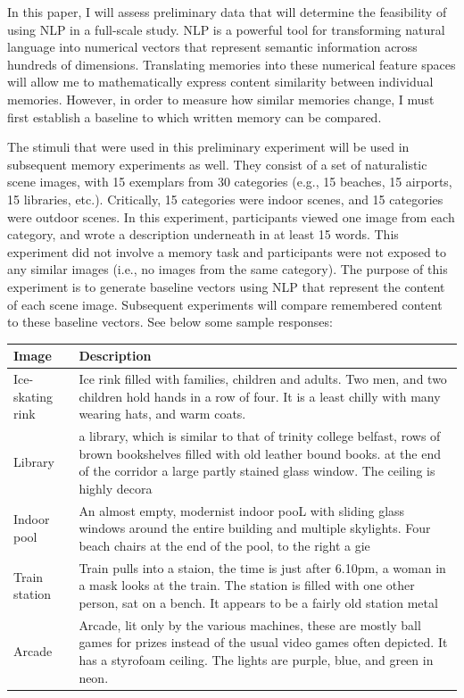 \documentclass[
  english,
  man]{apa6}
\begin{document}
In this paper, I will assess preliminary data that will determine the feasibility of using NLP in a full-scale study. NLP is a powerful tool for transforming natural language into numerical vectors that represent semantic information across hundreds of dimensions. Translating memories into these numerical feature spaces will allow me to mathematically express content similarity between individual memories. However, in order to measure how similar memories change, I must first establish a baseline to which written memory can be compared.

The stimuli that were used in this preliminary experiment will be used in subsequent memory experiments as well. They consist of a set of naturalistic scene images, with 15 exemplars from 30 categories (e.g., 15 beaches, 15 airports, 15 libraries, etc.). Critically, 15 categories were indoor scenes, and 15 categories were outdoor scenes. In this experiment, participants viewed one image from each category, and wrote a description underneath in at least 15 words. This experiment did not involve a memory task and participants were not exposed to any similar images (i.e., no images from the same category). The purpose of this experiment is to generate baseline vectors using NLP that represent the content of each scene image. Subsequent experiments will compare remembered content to these baseline vectors. See below some sample responses:

\begin{tabular}{l|>{\raggedright\arraybackslash}p{25em}}
\hline
Image & Description\\
\hline
Ice-skating rink & Ice rink filled with families, children and adults. Two men, and two children hold hands in a row of four. It is a least chilly with many wearing hats, and warm coats.\\
\hline
Library & a library, which is similar to that of trinity college belfast, rows of brown bookshelves filled with old leather bound books. at the end of the corridor a large partly stained glass window. The ceiling is highly decora\\
\hline
Indoor pool & An almost empty, modernist indoor pooL with sliding glass windows around the entire building and multiple skylights. Four beach chairs at the end of the pool, to the right a gie\\
\hline
Train station & Train pulls into a staion, the time is just after 6.10pm, a woman in a mask looks at the train. The station is filled with one other person, sat on a bench. It appears to be a fairly old station metal\\
\hline
Arcade & Arcade, lit only by the various machines, these are mostly ball games for prizes instead of the usual video games often depicted. It has a styrofoam ceiling. The lights are purple, blue, and green in neon.\\
\hline
\end{tabular}
\end{document}
